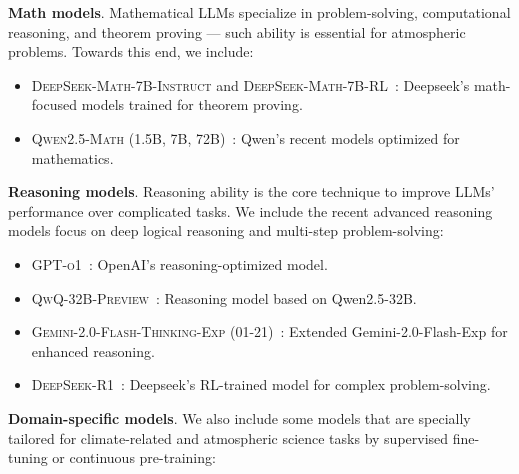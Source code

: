 \textbf{Math models}. Mathematical LLMs specialize in problem-solving, computational reasoning, and theorem proving --- such ability is essential for atmospheric problems. Towards this end, we include:

\begin{itemize}[topsep=5pt, leftmargin=1em]
\vspace{-0.5em}
\item \textsc{DeepSeek-Math-7B-Instruct} and \textsc{DeepSeek-Math-7B-RL}~\cite{shao2024deepseekmath}: Deepseek's math-focused models trained for theorem proving.

\vspace{-0.35em}
\item \textsc{Qwen2.5-Math} (1.5B, 7B, 72B)~\cite{yang2024qwen2}: Qwen's recent models optimized for mathematics.
\vspace{-0.5em}
\end{itemize}


\textbf{Reasoning models}. Reasoning ability is the core technique to improve LLMs' performance over complicated tasks. We include the recent advanced reasoning models focus on deep logical reasoning and multi-step problem-solving:

\begin{itemize}[topsep=5pt, leftmargin=1em]
\vspace{-0.5em}
\item \textsc{GPT-o1}~\cite{openai_learning_to_reason_with_llms}: OpenAI’s reasoning-optimized model.


\vspace{-0.35em} 
\item \textsc{QwQ-32B-Preview}~\cite{qwq-32b-preview}: Reasoning model based on Qwen2.5-32B.


\vspace{-0.35em}
\item \textsc{Gemini-2.0-Flash-Thinking-Exp (01-21)}~\cite{deepmind_gemini_flash_thinking}: Extended Gemini-2.0-Flash-Exp for enhanced reasoning.

\vspace{-0.5em}
\item \textsc{DeepSeek-R1}~\cite{deepseekai2025deepseekr1incentivizingreasoningcapability}: Deepseek's RL-trained model for complex problem-solving.

\end{itemize}




\textbf{Domain-specific models}. We also include some models that are specially tailored for climate-related and atmospheric science tasks by supervised fine-tuning or continuous pre-training:

